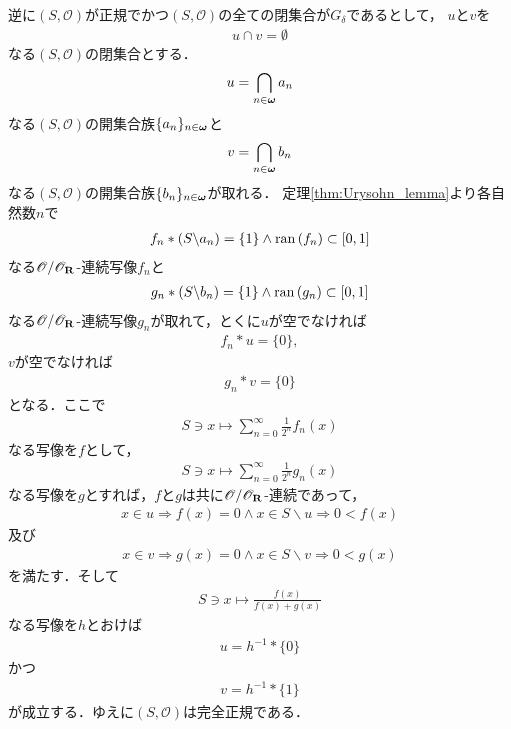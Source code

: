 \begin{sketch}
		逆に$(S,\mathscr{O})$が正規でかつ$(S,\mathscr{O})$の全ての閉集合が$G_\delta$であるとして，
		$u$と$v$を
		\begin{align}
			u \cap v = \emptyset
		\end{align}
		なる$(S,\mathscr{O})$の閉集合とする．
		\begin{align}
			u = \bigcap_{n \in {\boldsymbol \omega}} a_n
		\end{align}
		なる$(S,\mathscr{O})$の開集合族$\{a_n\}_{n \in {\boldsymbol \omega}}$と
		\begin{align}
			v = \bigcap_{n \in {\boldsymbol \omega}} b_n
		\end{align}
		なる$(S,\mathscr{O})$の開集合族$\{b_n\}_{n \in {\boldsymbol \omega}}$が取れる．
		定理\ref{thm:Urysohn_lemma}より各自然数$n$で
		\begin{align}
			f_n \ast (S \backslash a_n) = \{1\} \wedge \operatorname*{ran} \left(f_n\right) \subset [0,1]
		\end{align}
		なる$\mathscr{O}/\mathscr{O}_{\mathbf{R}}$-連続写像$f_n$と
		\begin{align}
			g_n \ast (S \backslash b_n) = \{1\} \wedge \operatorname*{ran} \left(g_n\right) \subset [0,1]
		\end{align}
		なる$\mathscr{O}/\mathscr{O}_{\mathbf{R}}$-連続写像$g_n$が取れて，とくに$u$が空でなければ
		\begin{align}
			f_n \ast u = \{0\},
		\end{align}
		$v$が空でなければ
		\begin{align}
			g_n \ast v = \{0\}
		\end{align}
		となる．ここで
		\begin{align}
			S \ni x \longmapsto \sum_{n=0}^\infty \frac{1}{2^n} f_n(x)
		\end{align}
		なる写像を$f$として，
		\begin{align}
			S \ni x \longmapsto \sum_{n=0}^\infty \frac{1}{2^n} g_n(x)
		\end{align}
		なる写像を$g$とすれば，$f$と$g$は共に$\mathscr{O}/\mathscr{O}_{\mathbf{R}}$-連続であって，
		\begin{align}
			x \in u \Longrightarrow f(x) = 0 \wedge x \in S \backslash u \Longrightarrow 0 < f(x)
		\end{align}
		及び
		\begin{align}
			x \in v \Longrightarrow g(x) = 0 \wedge x \in S \backslash v \Longrightarrow 0 < g(x)
		\end{align}
		を満たす．そして
		\begin{align}
			S \ni x \longmapsto \frac{f(x)}{f(x) + g(x)}
		\end{align}
		なる写像を$h$とおけば
		\begin{align}
			u = h^{-1} \ast \{0\}
		\end{align}
		かつ
		\begin{align}
			v = h^{-1} \ast \{1\}
		\end{align}
		が成立する．ゆえに$(S,\mathscr{O})$は完全正規である．
		\QED
	\end{sketch}